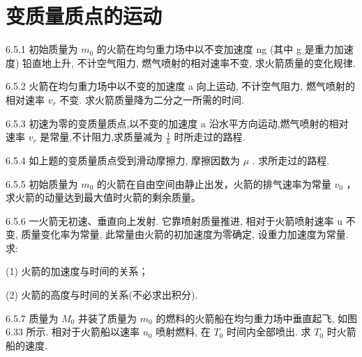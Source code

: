 \section{变质量质点的运动}

\begin{problem}{6.5.1}
初始质量为 $m_{0}$ 的火箭在均匀重力场中以不变加速度 ng (其中 g 是重力加速度) 铅直地上升, 不计空气阻力, 燃气喷射的相对速率不变, 求火箭质量的变化规律.
\end{problem}
\clearpage


\begin{problem}{6.5.2}
火箭在均匀重力场中以不变的加速度 a 向上运动, 不计空气阻力, 燃气喷射的相对速率 $v_{r}$ 不变. 求火箭质量降为二分之一所需的时间.
\end{problem}
\clearpage


\begin{problem}{6.5.3}
初速为零的变质量质点,以不变的加速度 a 沿水平方向运动,燃气喷射的相对速率 $v_{r}$ 是常量,不计阻力,求质量减为 $\frac{1}{k}$ 时所走过的路程.
\end{problem}
\clearpage


\begin{problem}{6.5.4}
如上题的变质量质点受到滑动摩擦力, 摩擦因数为 $\mu$ . 求所走过的路程.
\end{problem}
\clearpage


\begin{problem}{6.5.5}
初始质量为 $m_{0}$ 的火箭在自由空间由静止出发，火箭的排气速率为常量 $v_{0}$ ，求火箭的动量达到最大值时火箭的剩余质量。
\end{problem}
\clearpage


\begin{problem}{6.5.6}
一火箭无初速、垂直向上发射. 它靠喷射质量推进, 相对于火箭喷射速率 u 不变, 质量变化率为常量, 此常量由火箭的初加速度为零确定, 设重力加速度为常量. 求:

(1) 火箭的加速度与时间的关系；

(2) 火箭的高度与时间的关系(不必求出积分).
\end{problem}
\clearpage


\begin{problem}{6.5.7}
质量为 $M_0$ 并装了质量为 $m_0$ 的燃料的火箭船在均匀重力场中垂直起飞, 如图 6.33 所示. 相对于火箭船以速率 $u_0$ 喷射燃料, 在 $T_0$ 时间内全部喷出. 求 $T_0$ 时火箭船的速度.
\begin{center}

\end{center}
\end{problem}
\clearpage


